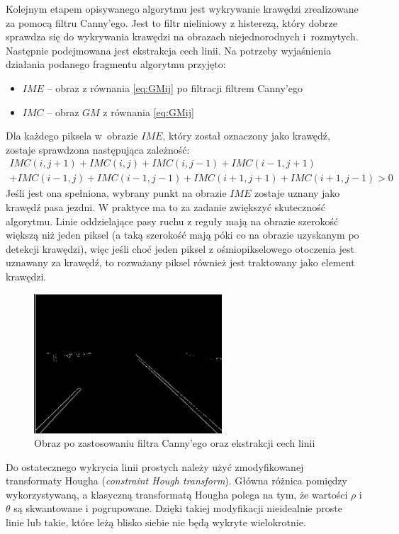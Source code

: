 Kolejnym etapem opisywanego algorytmu jest wykrywanie krawędzi zrealizowane za pomocą filtru Canny'ego. 
Jest to filtr nieliniowy z histerezą, który dobrze sprawdza się do wykrywania krawędzi na obrazach niejednorodnych i~rozmytych. 
Następnie podejmowana jest ekstrakcja cech linii. 
Na potrzeby wyjaśnienia działania podanego fragmentu algorytmu przyjęto:
\begin{itemize}
\item $IME$ -- obraz z równania \eqref{eq:GMij} po filtracji filtrem Canny'ego
\item $IMC$ -- obraz $GM$ z równania \eqref{eq:GMij}
\end{itemize}

Dla każdego piksela w~obrazie $IME$, który został oznaczony jako krawędź, zostaje sprawdzona następująca zależność:
\begin{equation}
	\begin{matrix}
	IMC(i,j+1)+IMC(i,j)+IMC(i,j-1)+IMC(i-1,j+1)\\
	+IMC(i-1,j)+IMC(i-1,j-1)+IMC(i+1,j+1)+IMC(i+1,j-1)>0
	\end{matrix}
\end{equation}
Jeśli jest ona spełniona, wybrany punkt na obrazie $IME$ zostaje uznany jako krawędź pasa jezdni.
W praktyce ma to za zadanie zwiększyć skuteczność algorytmu. 
Linie oddzielające pasy ruchu z reguły mają na obrazie szerokość większą niż jeden piksel (a taką szerokość mają póki co na obrazie uzyskanym po detekcji krawędzi), więc jeśli choć jeden piksel z ośmiopikselowego otoczenia jest uznawany za krawędź, to rozważany piksel również jest traktowany jako element krawędzi.

\begin{figure}
  \centering
  \includegraphics[width=7cm]{img/canny.png}
  \caption{Obraz po zastosowaniu filtra Canny'ego oraz ekstrakcji cech linii\cite{T3}}
  \label{fig:canny}
\end{figure}

Do ostatecznego wykrycia linii prostych należy użyć zmodyfikowanej transformaty Hougha (\textit{constraint Hough transform}). 
Główna różnica pomiędzy wykorzystywaną, a klasyczną transformatą Hougha polega na tym, że wartości $\rho$ i $\theta$ są skwantowane i pogrupowane. 
Dzięki takiej modyfikacji nieidealnie proste linie lub takie, które leżą blisko siebie nie będą wykryte wielokrotnie. 

